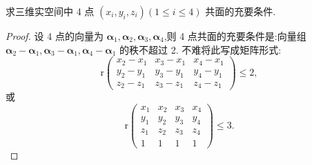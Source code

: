 \documentclass[lang=cn,newtx,10pt,scheme=chinese]{elegantbook}
\begin{document}
\begin{proposition}\label{proposition:三维实空间中4点共面}
求三维实空间中 4 点 \((x_i,y_i,z_i)(1\leq i\leq 4)\) 共面的充要条件.
\end{proposition}
\begin{proof}
    设 4 点的向量为 \(\boldsymbol{\alpha}_1,\boldsymbol{\alpha}_2,\boldsymbol{\alpha}_3,\boldsymbol{\alpha}_4\),则 4 点共面的充要条件是:向量组 \(\boldsymbol{\alpha}_2 - \boldsymbol{\alpha}_1,\boldsymbol{\alpha}_3 - \boldsymbol{\alpha}_1,\boldsymbol{\alpha}_4 - \boldsymbol{\alpha}_1\) 的秩不超过 2. 不难将此写成矩阵形式:
\[
\mathrm{r}\begin{pmatrix}
x_2 - x_1&x_3 - x_1&x_4 - x_1\\
y_2 - y_1&y_3 - y_1&y_4 - y_1\\
z_2 - z_1&z_3 - z_1&z_4 - z_1
\end{pmatrix}\leq2,
\]
或
\[
\mathrm{r}\begin{pmatrix}
x_1&x_2&x_3&x_4\\
y_1&y_2&y_3&y_4\\
z_1&z_2&z_3&z_4\\
1&1&1&1
\end{pmatrix}\leq3. 
\]
\end{proof}
\end{document}
